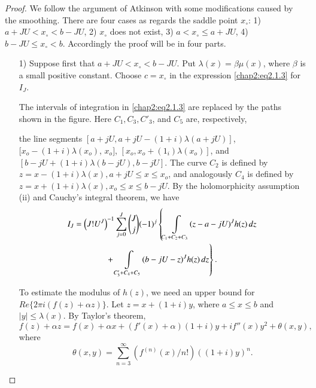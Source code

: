 \begin{proof}
We follow the argument of Atkinson \cite{key2} with some modifications
caused by the smoothing. There are four cases as regards the saddle
point $x_\circ$: 1) $a+JU<x_\circ<b-JU$, 2) $x_\circ$ does not exist,
3) $a<x_\circ\leq a+JU$, 4) $b-JU\leq x_\circ <b$. Accordingly the
proof will be in four parts.
\begin{enumerate}
\item [1)] Suppose first that $a+JU<x_\circ < b-JU$. Put
$\lambda(x)=\beta\mu(x)$, where $\beta$ is a small positive
  constant. Choose $c=x_\circ$ in the expression \eqref{chap2:eq2.1.3}
  for $I_J$.

The intervals of integration in \eqref{chap2:eq2.1.3} are
replaced by the paths shown in the figure. Here $C_1, C_3, C'_3$, and
$C_5$ are, respectively,
\begin{figure}[H]
\end{figure}\pageoriginale
the line segments $[a+jU, a+jU-(1+i)\lambda(a+jU)]$,
$[x_o-(1+i)\lambda(x_o)$, $x_o]$, $[x_o,x_o
  +(1_i)\lambda(x_o)]$, and $[b-jU+(1+i)\lambda(b-jU),b-jU]$. The
curve $C_2$ is defined by $z=x-(1+i)\lambda(x), a+jU\leq x\leq
x_o$, and analogously $C_4$ is defined by $z=x+(1+i)\lambda(x),
x_o \leq x\leq b-jU$. By the holomorphicity assumption (ii) and
Cauchy's integral theorem, we have  
\begin{gather}
I_J=\left(J!U^J\right)^{-1}\sum\limits_{j=0}^J\binom{J}{j}(-1)^j
\left\{ \int\limits_{C_1+C_2+C_3}(z-a-jU)^Jh(z)
\,dz\right.\label{chap2:eq2.1.15}\\ 
+\left.\int\limits_{C'_3+C_4+C_5}(b-jU-z)^Jh(z)\,dz\right\}.\notag
\end{gather}

To estimate the modulus of $h(z)$, we need an upper bound for
$Re\{2\pi i(f(z)+\alpha z)\}$. Let $z=x+(1+i)y$, where $a\leq
x\leq b$ and $|y|\leq\lambda(x)$. By Taylor's theorem,
\begin{equation}\label{chap2:eq2.1.16}
f(z)+\alpha z=f(x)+\alpha x+(f'(x)+\alpha)(1+i)y+if''(x)y^2+
\theta(x,y), 
\end{equation}
where
$$
\theta(x,y)=\sum\limits_{n=3}^\infty\left(f^{(n)}(x)/n!\right)
((1+i)y)^n.
$$


\end{enumerate}
\end{proof}
